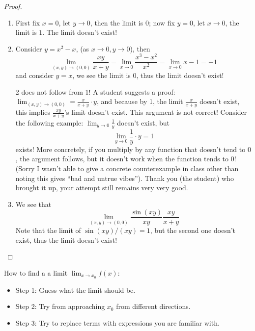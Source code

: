\documentclass[openany]{book}
\begin{document}
\begin{proof}
    \begin{enumerate}
        \item First fix $x=0$, let $y\to 0$, then the limit is $0$; now fix $y=0$, let $x\to 0$, the limit is $1$. The limit doesn't exist!
        \item Consider $y=x^2-x$, (as $x\to0, y\to 0$), then 
        \begin{equation*}
            \lim_{(x,y)\to(0,0)}\frac{xy}{x+y}=\lim_{x\to 0}\frac{x^3-x^2}{x^2}=\lim_{x\to 0}x-1=-1
        \end{equation*}
        and consider $y=x$, we see the limit is $0$, thus the limit doesn't exist!
        \begin{warn}
            2 does not follow from 1! A student suggests a proof: $\lim_{(x,y)\to(0,0)}=\frac{x}{x+y}\cdot y$, and because by 1, the limit $\frac{x}{x+y}$ doesn't exist, this implies $\frac{xy}{x+y}$'s limit doesn't exist. This argument is not correct! Consider the following example: $\lim_{y\to 0}\frac{1}{y}$ doesn't exist, but 
            \begin{equation*}
                \lim_{y\to 0}\frac{1}{y}\cdot y=1
            \end{equation*}
            exists! More concretely, if you multiply by any function that doesn't tend to $0$, the argument follows, but it doesn't work when the function tends to $0$! (Sorry I wasn't able to give a concrete counterexample in class other than noting this gives ``bad and untrue vibes''). Thank you (the student) who brought it up, your attempt still remains very very good.
        \end{warn}
        \item We see that 
        \begin{equation*}
            \lim_{(x,y)\to(0,0)}\frac{\sin(xy)}{xy}\frac{xy}{x+y}
        \end{equation*}
        Note that the limit of $\sin(xy)/(xy)=1$, but the second one doesn't exist, thus the limit doesn't exist!
    \end{enumerate}
\end{proof}


\noindent
How to find a a limit $\lim_{x\to x_0}f(x)$:
\begin{itemize}
    \item Step 1: Guess what the limit should be.
    \item Step 2: Try from approaching $x_0$ from different directions.
    \item Step 3: Try to replace terms with expressions you are familiar with.
\end{itemize}
\end{document}
